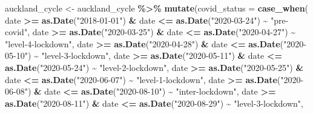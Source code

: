 \documentclass[
]{article}
\newenvironment{Shaded}{\begin{snugshade}}{\end{snugshade}}
\newcommand{\AttributeTok}[1]{\textcolor[rgb]{0.13,0.29,0.53}{#1}}
\newcommand{\FunctionTok}[1]{\textcolor[rgb]{0.13,0.29,0.53}{\textbf{#1}}}
\newcommand{\NormalTok}[1]{#1}
\newcommand{\OtherTok}[1]{\textcolor[rgb]{0.56,0.35,0.01}{#1}}
\newcommand{\SpecialCharTok}[1]{\textcolor[rgb]{0.81,0.36,0.00}{\textbf{#1}}}
\newcommand{\StringTok}[1]{\textcolor[rgb]{0.31,0.60,0.02}{#1}}
\begin{document}
\begin{Shaded}
\begin{Highlighting}[]
\NormalTok{auckland\_cycle }\OtherTok{\textless{}{-}}\NormalTok{ auckland\_cycle }\SpecialCharTok{\%\textgreater{}\%}
  \FunctionTok{mutate}\NormalTok{(}\AttributeTok{covid\_status =} \FunctionTok{case\_when}\NormalTok{(}
\NormalTok{    date }\SpecialCharTok{\textgreater{}=} \FunctionTok{as.Date}\NormalTok{(}\StringTok{"2018{-}01{-}01"}\NormalTok{) }\SpecialCharTok{\&}\NormalTok{ date }\SpecialCharTok{\textless{}=} \FunctionTok{as.Date}\NormalTok{(}\StringTok{"2020{-}03{-}24"}\NormalTok{) }\SpecialCharTok{\textasciitilde{}} \StringTok{"pre{-}covid"}\NormalTok{,}
\NormalTok{    date }\SpecialCharTok{\textgreater{}=} \FunctionTok{as.Date}\NormalTok{(}\StringTok{"2020{-}03{-}25"}\NormalTok{) }\SpecialCharTok{\&}\NormalTok{ date }\SpecialCharTok{\textless{}=} \FunctionTok{as.Date}\NormalTok{(}\StringTok{"2020{-}04{-}27"}\NormalTok{) }\SpecialCharTok{\textasciitilde{}} \StringTok{"level{-}4{-}lockdown"}\NormalTok{,}
\NormalTok{    date }\SpecialCharTok{\textgreater{}=} \FunctionTok{as.Date}\NormalTok{(}\StringTok{"2020{-}04{-}28"}\NormalTok{) }\SpecialCharTok{\&}\NormalTok{ date }\SpecialCharTok{\textless{}=} \FunctionTok{as.Date}\NormalTok{(}\StringTok{"2020{-}05{-}10"}\NormalTok{) }\SpecialCharTok{\textasciitilde{}} \StringTok{"level{-}3{-}lockdown"}\NormalTok{,}
\NormalTok{    date }\SpecialCharTok{\textgreater{}=} \FunctionTok{as.Date}\NormalTok{(}\StringTok{"2020{-}05{-}11"}\NormalTok{) }\SpecialCharTok{\&}\NormalTok{ date }\SpecialCharTok{\textless{}=} \FunctionTok{as.Date}\NormalTok{(}\StringTok{"2020{-}05{-}24"}\NormalTok{) }\SpecialCharTok{\textasciitilde{}} \StringTok{"level{-}2{-}lockdown"}\NormalTok{,}
\NormalTok{    date }\SpecialCharTok{\textgreater{}=} \FunctionTok{as.Date}\NormalTok{(}\StringTok{"2020{-}05{-}25"}\NormalTok{) }\SpecialCharTok{\&}\NormalTok{ date }\SpecialCharTok{\textless{}=} \FunctionTok{as.Date}\NormalTok{(}\StringTok{"2020{-}06{-}07"}\NormalTok{) }\SpecialCharTok{\textasciitilde{}} \StringTok{"level{-}1{-}lockdown"}\NormalTok{,}
\NormalTok{    date }\SpecialCharTok{\textgreater{}=} \FunctionTok{as.Date}\NormalTok{(}\StringTok{"2020{-}06{-}08"}\NormalTok{) }\SpecialCharTok{\&}\NormalTok{ date }\SpecialCharTok{\textless{}=} \FunctionTok{as.Date}\NormalTok{(}\StringTok{"2020{-}08{-}10"}\NormalTok{) }\SpecialCharTok{\textasciitilde{}} \StringTok{"inter{-}lockdown"}\NormalTok{,}
\NormalTok{    date }\SpecialCharTok{\textgreater{}=} \FunctionTok{as.Date}\NormalTok{(}\StringTok{"2020{-}08{-}11"}\NormalTok{) }\SpecialCharTok{\&}\NormalTok{ date }\SpecialCharTok{\textless{}=} \FunctionTok{as.Date}\NormalTok{(}\StringTok{"2020{-}08{-}29"}\NormalTok{) }\SpecialCharTok{\textasciitilde{}} \StringTok{"level{-}3{-}lockdown"}\NormalTok{,}

\end{Highlighting}
\end{Shaded}
\end{document}
